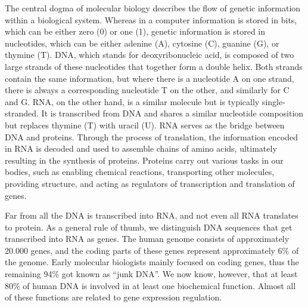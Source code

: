 The central dogma of molecular biology describes the flow of genetic information within a biological system. Whereas in a computer information is stored in bits, which can be either zero (0) or one (1), genetic information is stored in nucleotides, which can be either adenine (A), cytosine (C), guanine (G), or thymine (T). DNA, which stands for deoxyribonucleic acid, is composed of two large strands of these nucleotides that together form a double helix. Both strands contain the same information, but where there is a nucleotide A on one strand, there is always a corresponding nucleotide T on the other, and similarly for C and G. RNA, on the other hand, is a similar molecule but is typically single-stranded. It is transcribed from DNA and shares a similar nucleotide composition but replaces thymine (T) with uracil (U). RNA serves as the bridge between DNA and proteins. Through the process of translation, the information encoded in RNA is decoded and used to assemble chains of amino acids, ultimately resulting in the synthesis of proteins. Proteins carry out various tasks in our bodies, such as enabling chemical reactions, transporting other molecules, providing structure, and acting as regulators of transcription and translation of genes.

Far from all the DNA is transcribed into RNA, and not even all RNA translates to protein. As a general rule of thumb, we distinguish DNA sequences that get transcribed into RNA as genes. The human genome consists of approximately 20.000 genes, and the coding parts of these genes represent approximately 6\% of the genome\cite{Piovesan2019}. Early molecular biologists mainly focused on coding genes, thus the remaining 94\% got known as ``junk DNA''. We now know, however, that at least 80\% of human DNA is involved in at least one biochemical function\cite{encode2012}. Almost all of these functions are related to gene expression regulation.




